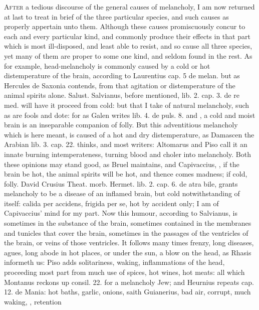 {{\lettrine{A}{fter} a tedious discourse of the general causes of melancholy, I am now
returned at last to treat in brief of the three particular species, and
such causes as properly appertain unto them. Although these causes
promiscuously concur to each and every particular kind, and commonly
produce their effects in that part which is most ill-disposed, and
least able to resist, and so cause all three species, yet many of them
are proper to some one kind, and seldom found in the rest. As for
example, head-melancholy is commonly caused by a cold or hot
distemperature of the brain, according to Laurentius \textlatin{cap. 5 de melan.}
but as Hercules de Saxonia contends, from that agitation or
distemperature of the animal spirits alone. Salust. Salvianus, before
mentioned, lib. 2. cap. 3. de re med. will have it proceed from cold:
but that I take of natural melancholy, such as are fools and dote: for
as Galen writes lib. 4. de puls. 8. and \Avicenna{}, a cold and
moist brain is an inseparable companion of folly. But this adventitious
melancholy which is here meant, is caused of a hot and dry
distemperature, as Damascen the Arabian lib. 3. cap. 22. thinks,
and most writers: Altomarus and Piso call it an innate burning
intemperateness, turning blood and choler into melancholy. Both these
opinions may stand good, as Bruel maintains, and Capivaccius, , if the brain be hot, the animal spirits
will be hot, and thence comes madness; if cold, folly. David Crusius
Theat. morb. Hermet. lib. 2. cap. 6. de atra bile, grants melancholy to
be a disease of an inflamed brain, but cold notwithstanding of itself:
calida per accidens, frigida per se, hot by accident only; I am of
Capivaccius' mind for my part. Now this humour, according to Salvianus,
is sometimes in the substance of the brain, sometimes contained in the
membranes and tunicles that cover the brain, sometimes in the passages
of the ventricles of the brain, or veins of those ventricles. It
follows many times frenzy, long diseases, agues, long abode in
hot places, or under the sun, a blow on the head, as Rhasis informeth
us: Piso adds solitariness, waking, inflammations of the head,
proceeding most part from much use of spices, hot wines, hot
meats: all which Montanus reckons up consil. 22. for a melancholy Jew;
and Heurnius repeats cap. 12. de Mania: hot baths, garlic, onions,
saith Guianerius, bad air, corrupt, much waking, \etc{}, retention
}}
